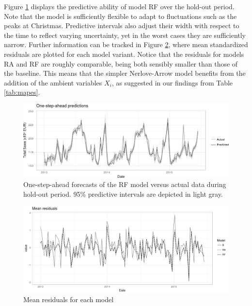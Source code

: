 

Figure \ref{fig:forecasts} displays the predictive ability of model RF over the hold-out period. Note that the model is sufficiently flexible to adapt to fluctuations such as the peaks at Christmas. Predictive intervals also adjust their width with respect to the time to reflect varying uncertainty, yet in the worst cases they are sufficiently narrow. Further information can be tracked in Figure \ref{fig:residuals}, where mean standardized residuals are plotted for each model variant. Notice that the residuals for models RA and RF are roughly comparable, being both sensibly smaller than those of the baseline. This means that the simpler Nerlove-Arrow model benefits from the addition of the ambient variables $X_i$, as suggested in our findings from Table \ref{tab:mapes}.
\begin{figure}[h]
\centering
\includegraphics[scale=0.55]{figures/forecasts.png}
\caption{One-step-ahead forecasts of the RF model versus actual data during hold-out period. 95\% predictive intervals are depicted in light gray.}\label{fig:forecasts}
\end{figure}



\begin{figure}[H]
\centering
\includegraphics[scale=0.6]{figures/resis.png}
\caption{Mean residuals for each model}\label{fig:residuals}
\end{figure}

